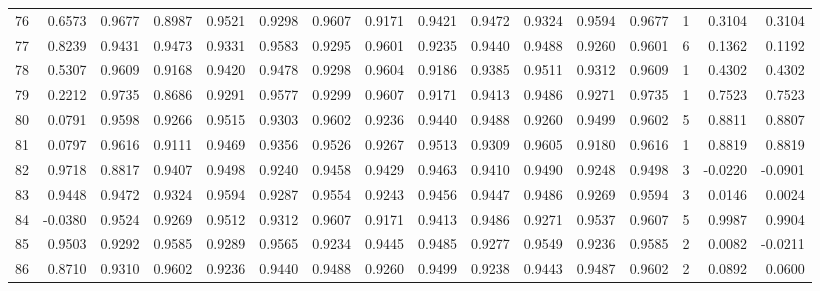 \begin{tabular}{lrrrrrrrrrrrrrrr}
76  &      0.6573 &  0.9677 &  0.8987 &  0.9521 &  0.9298 &  0.9607 &  0.9171 &  0.9421 &  0.9472 &  0.9324 &   0.9594 &     0.9677 &      1 &                    0.3104 &                     0.3104 \\
77  &      0.8239 &  0.9431 &  0.9473 &  0.9331 &  0.9583 &  0.9295 &  0.9601 &  0.9235 &  0.9440 &  0.9488 &   0.9260 &     0.9601 &      6 &                    0.1362 &                     0.1192 \\
78  &      0.5307 &  0.9609 &  0.9168 &  0.9420 &  0.9478 &  0.9298 &  0.9604 &  0.9186 &  0.9385 &  0.9511 &   0.9312 &     0.9609 &      1 &                    0.4302 &                     0.4302 \\
79  &      0.2212 &  0.9735 &  0.8686 &  0.9291 &  0.9577 &  0.9299 &  0.9607 &  0.9171 &  0.9413 &  0.9486 &   0.9271 &     0.9735 &      1 &                    0.7523 &                     0.7523 \\
80  &      0.0791 &  0.9598 &  0.9266 &  0.9515 &  0.9303 &  0.9602 &  0.9236 &  0.9440 &  0.9488 &  0.9260 &   0.9499 &     0.9602 &      5 &                    0.8811 &                     0.8807 \\
81  &      0.0797 &  0.9616 &  0.9111 &  0.9469 &  0.9356 &  0.9526 &  0.9267 &  0.9513 &  0.9309 &  0.9605 &   0.9180 &     0.9616 &      1 &                    0.8819 &                     0.8819 \\
82  &      0.9718 &  0.8817 &  0.9407 &  0.9498 &  0.9240 &  0.9458 &  0.9429 &  0.9463 &  0.9410 &  0.9490 &   0.9248 &     0.9498 &      3 &                   -0.0220 &                    -0.0901 \\
83  &      0.9448 &  0.9472 &  0.9324 &  0.9594 &  0.9287 &  0.9554 &  0.9243 &  0.9456 &  0.9447 &  0.9486 &   0.9269 &     0.9594 &      3 &                    0.0146 &                     0.0024 \\
84  &     -0.0380 &  0.9524 &  0.9269 &  0.9512 &  0.9312 &  0.9607 &  0.9171 &  0.9413 &  0.9486 &  0.9271 &   0.9537 &     0.9607 &      5 &                    0.9987 &                     0.9904 \\
85  &      0.9503 &  0.9292 &  0.9585 &  0.9289 &  0.9565 &  0.9234 &  0.9445 &  0.9485 &  0.9277 &  0.9549 &   0.9236 &     0.9585 &      2 &                    0.0082 &                    -0.0211 \\
86  &      0.8710 &  0.9310 &  0.9602 &  0.9236 &  0.9440 &  0.9488 &  0.9260 &  0.9499 &  0.9238 &  0.9443 &   0.9487 &     0.9602 &      2 &                    0.0892 &                     0.0600 \\

\end{tabular}
